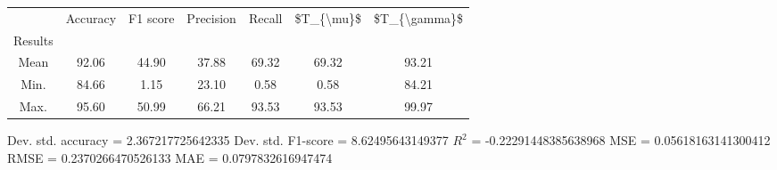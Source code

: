 \begin{tabular}{|c|c|c|c|c|c|c|}
\toprule
{} &  Accuracy &  F1 score &  Precision &  Recall &  \$T\_\{\textbackslash mu\}\$ &  \$T\_\{\textbackslash gamma\}\$ \\
Results &           &           &            &         &            &               \\
\hline
Mean    &     92.06 &     44.90 &      37.88 &   69.32 &      69.32 &         93.21 \\
Min.    &     84.66 &      1.15 &      23.10 &    0.58 &       0.58 &         84.21 \\
Max.    &     95.60 &     50.99 &      66.21 &   93.53 &      93.53 &         99.97 \\
\bottomrule
\end{tabular}

 Dev. std. accuracy = 2.367217725642335
 Dev. std. F1-score = 8.62495643149377
 $R^2$ = -0.22291448385638968
 MSE = 0.05618163141300412
 RMSE = 0.2370266470526133
 MAE = 0.0797832616947474
